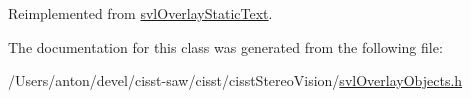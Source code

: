 Reimplemented from \hyperlink{classsvl_overlay_static_text_aaa85a4335f542db5815d5dac71c7dc8b}{svl\+Overlay\+Static\+Text}.



The documentation for this class was generated from the following file\+:\begin{DoxyCompactItemize}
\item 
/\+Users/anton/devel/cisst-\/saw/cisst/cisst\+Stereo\+Vision/\hyperlink{svl_overlay_objects_8h}{svl\+Overlay\+Objects.\+h}\end{DoxyCompactItemize}
